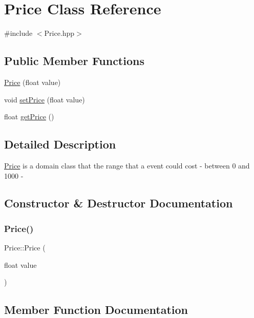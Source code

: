 \hypertarget{class_price}{}\section{Price Class Reference}
\label{class_price}


{\ttfamily \#include $<$Price.\+hpp$>$}

\subsection*{Public Member Functions}
\begin{DoxyCompactItemize}
\item 
\mbox{\hyperlink{class_price_a8b96acfdb91be413198c6c8d4487300e}{Price}} (float value)
\item 
void \mbox{\hyperlink{class_price_a66ba29e9ab95f10b5d21b171317045c3}{set\+Price}} (float value)
\item 
float \mbox{\hyperlink{class_price_af2ec5c04c31c740bb4c4d94c3891ecc2}{get\+Price}} ()
\end{DoxyCompactItemize}


\subsection{Detailed Description}
\mbox{\hyperlink{class_price}{Price}} is a domain class that the range that a event could cost -\/ between 0 and 1000 -\/ 

\subsection{Constructor \& Destructor Documentation}
\mbox{\label{class_price_a8b96acfdb91be413198c6c8d4487300e}} 
\subsubsection{\texorpdfstring{Price()}{Price()}}
{\footnotesize\ttfamily Price\+::\+Price (\begin{DoxyParamCaption}\item[{float}]{value }\end{DoxyParamCaption})}



\subsection{Member Function Documentation}
\mbox{\label{class_price_af2ec5c04c31c740bb4c4d94c3891ecc2}} 
